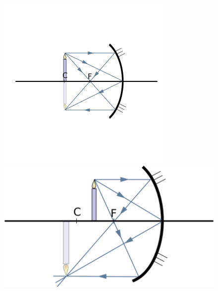 \documentclass[11pt]{article}
\begin{document}
\begin{enumerate}
\begin{figure}[!ht]
					\includegraphics[width=\linewidth]{assets/mirrors/sphere_mirror2.png}
				\endminipage\hfill
					\includegraphics[width=\linewidth]{assets/mirrors/sphere_mirror3.png}
				\endminipage\hfill

\end{figure}
\end{enumerate}
\end{document}
